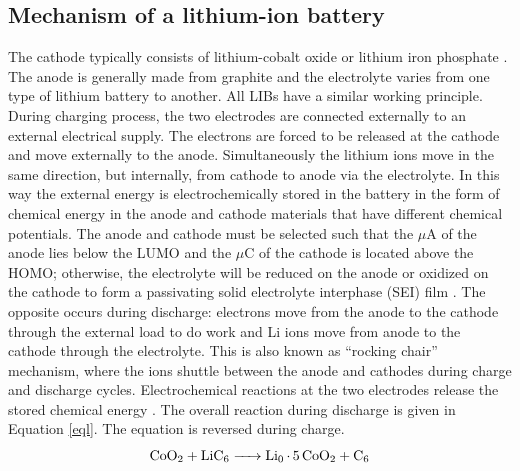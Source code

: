 \subsection*{Mechanism of a lithium-ion battery}
The cathode typically consists of lithium-cobalt oxide  or lithium iron phosphate . The anode is generally made from graphite and the electrolyte varies from one type of lithium battery to another. All LIBs have a similar working principle. During charging process, the two electrodes are connected externally to an external electrical supply. The electrons are forced to be released at the cathode and move externally to the anode. Simultaneously the lithium ions move in the same direction, but internally, from cathode to anode via the electrolyte. In this way the external energy is electrochemically stored in the battery in the form of chemical energy in the anode and cathode materials that have different chemical potentials. The anode and cathode must be selected such that the $\mu$A of the anode lies below the LUMO and the $\mu$C of the cathode is located above the HOMO; otherwise, the electrolyte will be reduced on the anode or oxidized on the cathode to form a passivating solid electrolyte interphase (SEI) film \cite{goodenough_challenges_2010}. The opposite occurs during discharge: electrons move from the anode to the cathode through the external load to do work and Li ions move from anode to the cathode through the electrolyte. This is also known as \enquote{rocking chair} mechanism, where the  ions shuttle between the anode and cathodes during charge and discharge cycles. Electrochemical reactions at the two electrodes release the stored chemical energy \cite{deng_li-ion_2015}. The overall reaction during discharge is given in Equation \ref{eql}. The equation is reversed during charge. 
\begin{equation}\label{eql}
    \ce{CoO2 + LiC6 -> Li_0.5CoO2 + C6}
\end{equation}


